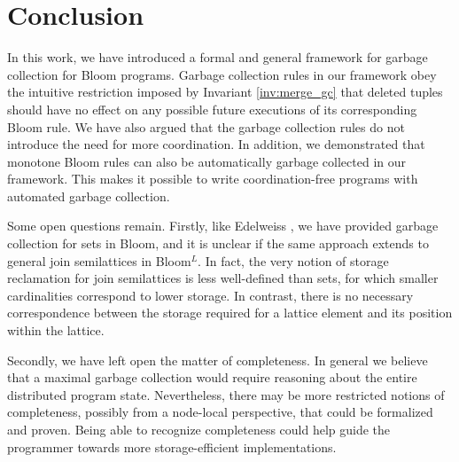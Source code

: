 
\section{Conclusion}
\label{sec:conclude}

In this work, we have introduced a formal and general framework for garbage collection for Bloom programs.
Garbage collection rules in our framework obey the intuitive restriction imposed by Invariant \ref{inv:merge_gc} that deleted tuples should have no effect on any possible future executions of its corresponding Bloom rule.
We have also argued that the garbage collection rules do not introduce the need for more coordination.
In addition, we demonstrated that monotone Bloom rules can also be automatically garbage collected in our framework.
This makes it possible to write coordination-free programs with automated garbage collection.

Some open questions remain.
Firstly, like Edelweiss \cite{conway2014edelweiss}, we have provided garbage collection for sets in Bloom, and it is unclear if the same approach extends to general join semilattices in Bloom$^L$.
In fact, the very notion of storage reclamation for join semilattices is less well-defined than sets, for which smaller cardinalities correspond to lower storage.
In contrast, there is no necessary correspondence between the storage required for a lattice element and its position within the lattice.

Secondly, we have left open the matter of completeness.
In general we believe that a maximal garbage collection would require reasoning about the entire distributed program state.
Nevertheless, there may be more restricted notions of completeness, possibly from a node-local perspective, that could be formalized and proven.
Being able to recognize completeness could help guide the programmer towards more storage-efficient implementations.